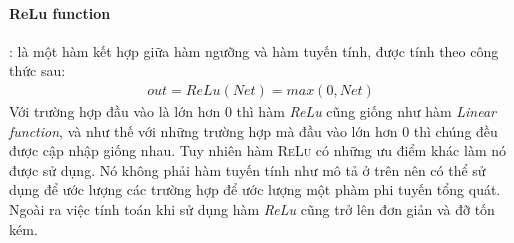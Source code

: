 \documentclass[fontsize=12pt]{scrartcl}
\begin{document}
\paragraph*{ReLu function}: là một hàm kết hợp giữa hàm ngưỡng và hàm tuyến tính, được tính theo công thức sau:
\begin{align}
out = ReLu(Net) = max(0,Net)
\end{align}
Với trường hợp đầu vào là lớn hơn 0 thì hàm \textit{ReLu} cũng giống như hàm \textit{Linear function}, và như thế với những trường hợp mà đầu vào lớn hơn 0 thì chúng đều được cập nhập giống nhau. Tuy nhiên hàm \textsc{ReLu} có những ưu điểm khác làm nó được sử dụng. Nó không phải hàm tuyến tính như mô tả ở trên nên có thể sử dụng để ước lượng các trường hợp để ước lượng một phàm phi tuyến tổng quát. Ngoài ra việc tính toán khi sử dụng hàm \textit{ReLu} cũng trở lên đơn giản và đỡ tốn kém.
\end{document}
